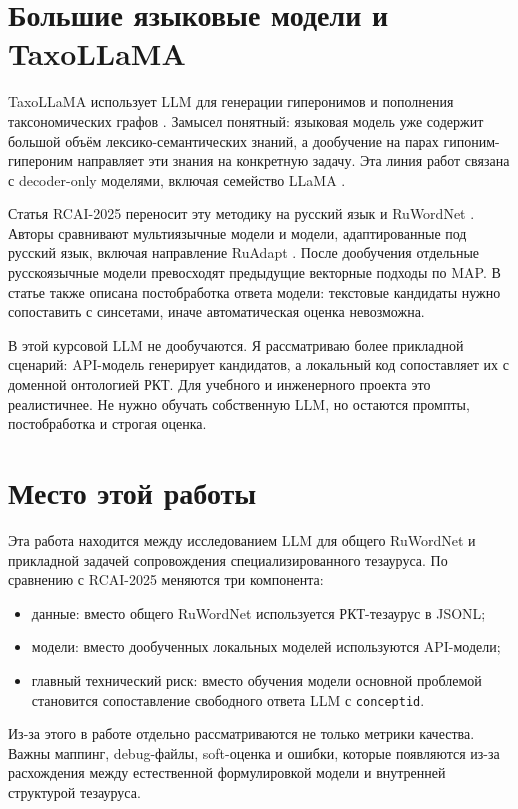 \documentclass[12pt,a4paper,oneside,openany]{report}
\begin{document}
\section{Большие языковые модели и TaxoLLaMA}

TaxoLLaMA использует LLM для генерации гиперонимов и пополнения таксономических графов \cite{taxollama}. Замысел понятный: языковая модель уже содержит большой объём лексико-семантических знаний, а дообучение на парах гипоним-гипероним направляет эти знания на конкретную задачу. Эта линия работ связана с decoder-only моделями, включая семейство LLaMA \cite{touvron2023}.

Статья RCAI-2025 переносит эту методику на русский язык и RuWordNet \cite{rcai2025}. Авторы сравнивают мультиязычные модели и модели, адаптированные под русский язык, включая направление RuAdapt \cite{ruadapt2024}. После дообучения отдельные русскоязычные модели превосходят предыдущие векторные подходы по MAP. В статье также описана постобработка ответа модели: текстовые кандидаты нужно сопоставить с синсетами, иначе автоматическая оценка невозможна.

В этой курсовой LLM не дообучаются. Я рассматриваю более прикладной сценарий: API-модель генерирует кандидатов, а локальный код сопоставляет их с доменной онтологией РКТ. Для учебного и инженерного проекта это реалистичнее. Не нужно обучать собственную LLM, но остаются промпты, постобработка и строгая оценка.

\section{Место этой работы}

Эта работа находится между исследованием LLM для общего RuWordNet и прикладной задачей сопровождения специализированного тезауруса. По сравнению с RCAI-2025 меняются три компонента:
\begin{itemize}
  \item данные: вместо общего RuWordNet используется РКТ-тезаурус в JSONL;
  \item модели: вместо дообученных локальных моделей используются API-модели;
  \item главный технический риск: вместо обучения модели основной проблемой становится сопоставление свободного ответа LLM с \texttt{conceptid}.
\end{itemize}

Из-за этого в работе отдельно рассматриваются не только метрики качества. Важны маппинг, debug-файлы, soft-оценка и ошибки, которые появляются из-за расхождения между естественной формулировкой модели и внутренней структурой тезауруса.
\end{document}
